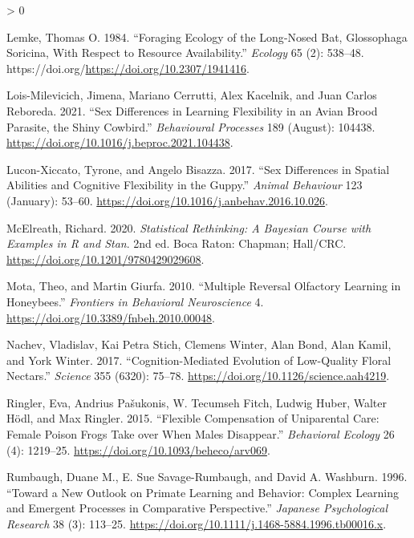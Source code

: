 \documentclass[
]{article}
\newlength{\cslhangindent}
\newenvironment{CSLReferences}[2] %
 {%
  \setlength{\parindent}{0pt}
  \ifodd #1 \everypar{\setlength{\hangindent}{\cslhangindent}}\ignorespaces\fi
  \ifnum #2 > 0
  \setlength{\parskip}{#2\baselineskip}
  \fi
 }%
 {}
\begin{document}
\begin{CSLReferences}{1}{0}
\leavevmode\hypertarget{ref-lemke_foraging_1984}{}%
Lemke, Thomas O. 1984. {``Foraging {Ecology} of the {Long}-{Nosed} {Bat}, {Glossophaga} {Soricina}, {With} {Respect} to {Resource} {Availability}.''} \emph{Ecology} 65 (2): 538--48. https://doi.org/\url{https://doi.org/10.2307/1941416}.

\leavevmode\hypertarget{ref-lois-milevicich_sex_2021}{}%
Lois-Milevicich, Jimena, Mariano Cerrutti, Alex Kacelnik, and Juan Carlos Reboreda. 2021. {``Sex Differences in Learning Flexibility in an Avian Brood Parasite, the Shiny Cowbird.''} \emph{Behavioural Processes} 189 (August): 104438. \url{https://doi.org/10.1016/j.beproc.2021.104438}.

\leavevmode\hypertarget{ref-lucon-xiccato_sex_2017}{}%
Lucon-Xiccato, Tyrone, and Angelo Bisazza. 2017. {``Sex Differences in Spatial Abilities and Cognitive Flexibility in the Guppy.''} \emph{Animal Behaviour} 123 (January): 53--60. \url{https://doi.org/10.1016/j.anbehav.2016.10.026}.

\leavevmode\hypertarget{ref-mcelreath_statistical_2020}{}%
McElreath, Richard. 2020. \emph{Statistical {Rethinking}: {A} {Bayesian} {Course} with {Examples} in {R} and {Stan}}. 2nd ed. Boca Raton: Chapman; Hall/CRC. \url{https://doi.org/10.1201/9780429029608}.

\leavevmode\hypertarget{ref-mota_multiple_2010}{}%
Mota, Theo, and Martin Giurfa. 2010. {``Multiple {Reversal} {Olfactory} {Learning} in {Honeybees}.''} \emph{Frontiers in Behavioral Neuroscience} 4. \url{https://doi.org/10.3389/fnbeh.2010.00048}.

\leavevmode\hypertarget{ref-nachev_cognition-mediated_2017}{}%
Nachev, Vladislav, Kai Petra Stich, Clemens Winter, Alan Bond, Alan Kamil, and York Winter. 2017. {``Cognition-Mediated Evolution of Low-Quality Floral Nectars.''} \emph{Science} 355 (6320): 75--78. \url{https://doi.org/10.1126/science.aah4219}.

\leavevmode\hypertarget{ref-ringler_flexible_2015}{}%
Ringler, Eva, Andrius Pašukonis, W. Tecumseh Fitch, Ludwig Huber, Walter Hödl, and Max Ringler. 2015. {``Flexible Compensation of Uniparental Care: Female Poison Frogs Take over When Males Disappear.''} \emph{Behavioral Ecology} 26 (4): 1219--25. \url{https://doi.org/10.1093/beheco/arv069}.

\leavevmode\hypertarget{ref-rumbaugh_toward_1996}{}%
Rumbaugh, Duane M., E. Sue Savage-Rumbaugh, and David A. Washburn. 1996. {``Toward a New Outlook on Primate Learning and Behavior: Complex Learning and Emergent Processes in Comparative Perspective.''} \emph{Japanese Psychological Research} 38 (3): 113--25. \url{https://doi.org/10.1111/j.1468-5884.1996.tb00016.x}.


\end{CSLReferences}
\end{document}
